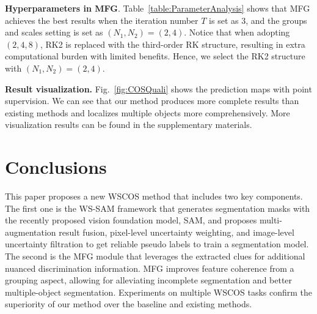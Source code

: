 \noindent\textbf{Hyperparameters in MFG}. 
Table~\ref{table:ParameterAnalysis} shows that MFG achieves the best  results when the iteration number $T$ is set as 3, and the groups and scales setting is set as $(N_1, N_2)=(2,4)$. Notice that when adopting $(2,4,8)$, RK2 is replaced with the third-order RK structure, resulting in extra computational burden with limited benefits. Hence, we select the RK2 structure with $(N_1, N_2)=(2,4)$.

\noindent \textbf{Result visualization.}
Fig.~\ref{fig:COSQuali} shows the prediction maps with point supervision. We can see that our method produces more complete results than existing methods and localizes multiple objects more comprehensively. More visualization results can be found in the supplementary materials.  

\vspace{-2mm}
\section{Conclusions} \vspace{-1mm}
This paper proposes a new WSCOS method that includes two key components. The first one is the WS-SAM framework that generates segmentation masks with the recently proposed vision foundation model, SAM, and proposes multi-augmentation result fusion, pixel-level uncertainty weighting, and image-level uncertainty filtration to get reliable pseudo labels to train a segmentation model. The second is the MFG module that leverages the extracted clues for additional nuanced discrimination information. MFG improves feature coherence from a grouping aspect, allowing for alleviating incomplete segmentation and better multiple-object segmentation. Experiments on multiple WSCOS tasks confirm the superiority of our method over the baseline and existing methods.  

\clearpage
{\small
}

